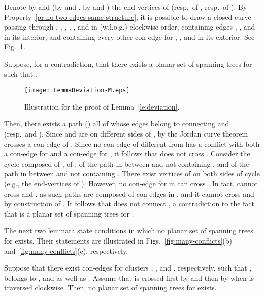 \documentclass[letter,runningheads]{llncs}
\renewenvironment{proof}
{{\em Proof.\ }}{\hspace*{\fill}\par\vspace{2mm}}
\begin{document}
\begin{proof}
Denote by  and  (by  and , by  and ) the end-vertices of  (resp.\ of , resp.\ of ). By Property~\ref{pr:no-two-edges-same-structure}, it is possible to draw a closed curve  passing through , , , , , and  in (w.l.o.g.) clockwise order, containing edges , , and  in its interior, and containing every other con-edge for , , and  in its exterior. See Fig.~\ref{fig:lemma-deviation}.

Suppose, for a contradiction, that there exists a planar set  of spanning trees for  such that .
\begin{figure}[tb]
\begin{center}
\mbox{\texttt{[image: LemmaDeviation-M.eps]}}
\caption{Illustration for the proof of Lemma~\ref{le:deviation}.}
\label{fig:lemma-deviation}
\end{center}
\end{figure}
Then, there exists a path  () all of whose edges belong to  connecting  and  (resp.\  and ). Since  and  are on different sides of , by the Jordan curve theorem  crosses a con-edge  of . Since no con-edge of  different from  has a conflict with both a con-edge for  and a con-edge for , it follows that  does not cross . Consider the cycle  composed of , of , of the path  in  between  and  not containing , and of the path  in  between  and  not containing . There exist vertices of  on both sides of cycle  (e.g., the end-vertices of ). However, no con-edge  for  in  can cross . In fact,  cannot cross  and , as such paths are composed of con-edges in , and it cannot cross  and  by construction of . It follows that  does not connect , a contradiction to the fact that  is a planar set of spanning trees for .
\end{proof}



The next two lemmata state conditions in which no planar set of spanning trees for  exists. Their statements are illustrated in Figs.~\ref{fig:many-conflicts}(b) and~\ref{fig:many-conflicts}(c), respectively.

\begin{lemma}[{\sc Test 3}]\label{le:same-order}
Suppose that there exist con-edges  for clusters , , and , respectively, such that  ,  belongs to , and  as well as . Assume that  is crossed first by  and then by  when  is traversed clockwise. Then, no planar set of spanning trees for  exists.
\end{lemma}
\end{document}
